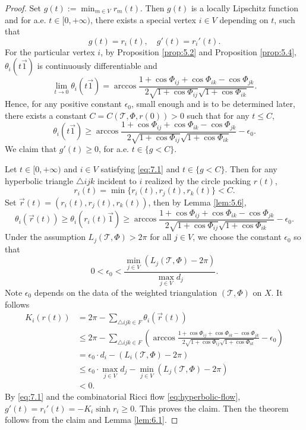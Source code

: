 \documentclass[12pt]{amsart}
\numberwithin{equation}{section}
\begin{document}
\begin{proof}
Set $g(t) := \min_{m \in V} r_m(t)$. Then $g(t)$ is a locally Lipschitz function and for a.e. $t \in [0,+\infty)$,
there exists a special vertex $i \in V$ depending on $t$, such that
\begin{equation}\label{eq:7.1}
g(t) = r_i(t), \quad g'(t) = r_i'(t).
\end{equation}
For the particular vertex $i$, by Proposition \ref{prop:5.2} and Proposition \ref{prop:5.4}, $\theta_i(t\vec{1})$ is continuously differentiable
and
\[
\lim_{t \to 0} \theta_i(t\vec{1}) = \arccos \frac{1 + \cos\Phi_{ij} + \cos\Phi_{ik} - \cos\Phi_{jk}}{2\sqrt{1 + \cos\Phi_{ij}}\sqrt{1 + \cos\Phi_{ik}}}.
\]
Hence, for any positive constant $\epsilon_0$, small enough and is to be determined later, there exists a constant
$C = C(\mathcal{T}, \Phi, r(0)) > 0$ such that for any $t \leq C$,
\[
\theta_i(t\vec{1}) \geq \arccos \frac{1 + \cos\Phi_{ij} + \cos\Phi_{ik} - \cos\Phi_{jk}}{2\sqrt{1 + \cos\Phi_{ij}}\sqrt{1 + \cos\Phi_{ik}}} - \epsilon_0.
\]
We claim that $g'(t) \geq 0$, for a.e. $t \in \{g < C\}$.

Let $t \in [0,+\infty)$ and $i \in V$ satisfying \eqref{eq:7.1} and $t \in \{g < C\}$. Then for any hyperbolic triangle $\triangle ijk$
incident to $i$ realized by the circle packing $r(t)$,
\[
r_i(t) = \min\{r_i(t), r_j(t), r_k(t)\} < C.
\]
Set $\vec{r}(t) = (r_i(t), r_j(t), r_k(t))$, then by Lemma \ref{lem:5.6},
\[
\theta_i(\vec{r}(t)) \geq \theta_i(r_i(t)\vec{1}) \geq \arccos \frac{1 + \cos\Phi_{ij} + \cos\Phi_{ik} - \cos\Phi_{jk}}{2\sqrt{1 + \cos\Phi_{ij}}\sqrt{1 + \cos\Phi_{ik}}} - \epsilon_0.
\]
Under the assumption $L_j(\mathcal{T},\Phi) > 2\pi$ for all $j \in V$, we choose the constant $\epsilon_0$ so that
\[
0 < \epsilon_0 < \frac{\min_{j \in V}(L_j(\mathcal{T},\Phi) - 2\pi)}{\max_{j \in V} d_j}.
\]
Note $\epsilon_0$ depends on the data of the weighted triangulation $(\mathcal{T},\Phi)$ on $X$. It follows
\begin{align*}
K_i(r(t)) &= 2\pi - \sum_{\triangle ijk \in F} \theta_i(\vec{r}(t)) \\
&\leq 2\pi - \sum_{\triangle ijk \in F} \left(\arccos \frac{1 + \cos\Phi_{ij} + \cos\Phi_{ik} - \cos\Phi_{jk}}{2\sqrt{1 + \cos\Phi_{ij}}\sqrt{1 + \cos\Phi_{ik}}} - \epsilon_0\right) \\
&= \epsilon_0 \cdot d_i - (L_i(\mathcal{T},\Phi) - 2\pi) \\
&\leq \epsilon_0 \cdot \max_{j \in V} d_j - \min_{j \in V}(L_j(\mathcal{T},\Phi) - 2\pi) \\
&< 0.
\end{align*}
By \eqref{eq:7.1} and the combinatorial Ricci flow \eqref{eq:hyperbolic-flow}, $g'(t) = r_i'(t) = -K_i \sinh r_i \geq 0$. This proves the claim.
Then the theorem follows from the claim and Lemma \ref{lem:6.1}.
\end{proof}
\end{document}
